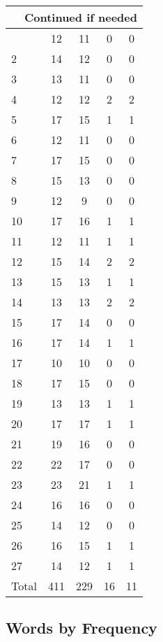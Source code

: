 \begin{center}
\begin{longtable}{l|c|c|c|c}
\hline \multicolumn{5}{|r|}{{Continued if needed}} \\ \hline
\endfoot 
1 & 12 & 11 & 0 & 0\\ \hline
2 & 14 & 12 & 0 & 0\\ \hline
3 & 13 & 11 & 0 & 0\\ \hline
4 & 12 & 12 & 2 & 2\\ \hline
5 & 17 & 15 & 1 & 1\\ \hline
6 & 12 & 11 & 0 & 0\\ \hline
7 & 17 & 15 & 0 & 0\\ \hline
8 & 15 & 13 & 0 & 0\\ \hline
9 & 12 & 9 & 0 & 0\\ \hline
10 & 17 & 16 & 1 & 1\\ \hline
11 & 12 & 11 & 1 & 1\\ \hline
12 & 15 & 14 & 2 & 2\\ \hline
13 & 15 & 13 & 1 & 1\\ \hline
14 & 13 & 13 & 2 & 2\\ \hline
15 & 17 & 14 & 0 & 0\\ \hline
16 & 17 & 14 & 1 & 1\\ \hline
17 & 10 & 10 & 0 & 0\\ \hline
18 & 17 & 15 & 0 & 0\\ \hline
19 & 13 & 13 & 1 & 1\\ \hline
20 & 17 & 17 & 1 & 1\\ \hline
21 & 19 & 16 & 0 & 0\\ \hline
22 & 22 & 17 & 0 & 0\\ \hline
23 & 23 & 21 & 1 & 1\\ \hline
24 & 16 & 16 & 0 & 0\\ \hline
25 & 14 & 12 & 0 & 0\\ \hline
26 & 16 & 15 & 1 & 1\\ \hline
27 & 14 & 12 & 1 & 1\\ \hline
\hline \hline
Total & 411 & 229 & 16 & 11




\end{longtable}
\end{center}



\subsection{Words by Frequency}


